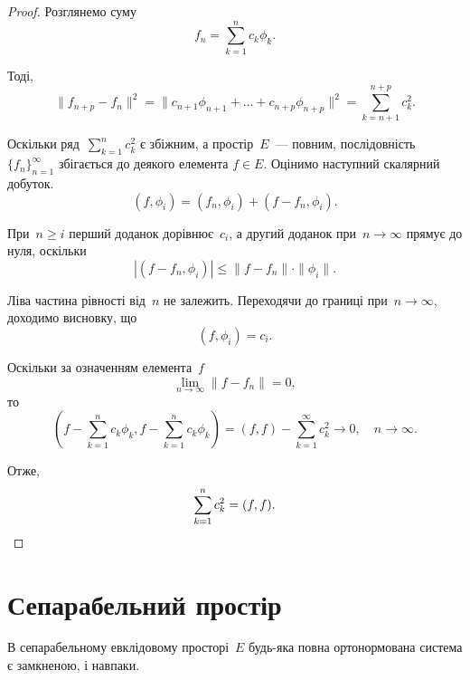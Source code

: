 \begin{proof}
Розглянемо суму
\begin{equation*}
    f_n = \sum_{k = 1}^n c_k \phi_k.
\end{equation*}

Тоді,
\begin{equation*}
    \|f_{n + p} - f_n\|^2 =
    \|c_{n + 1} \phi_{n + 1} + \dots + c_{n + p} \phi_{n + p}\|^2 =
    \sum_{k = n + 1}^{n + p} c_k^2.
\end{equation*}

Оскільки ряд~$\sum_{k = 1}^n c_k^2$ є збіжним, а простір~$E$~--- повним,
послідовність~$\{f_n\}_{n = 1}^\infty$ збігається до деякого елемента
$f \in E$. Оцінимо наступний скалярний добуток.
\begin{equation*}
    (f, \phi_i) = (f_n, \phi_i) + (f - f_n, \phi_i).
\end{equation*}

При~$n \ge i$ перший доданок дорівнює~$c_i$, а другий доданок
при~$n \to \infty$ прямує до нуля, оскільки
\begin{equation*}
    |(f - f_n, \phi_i)| \le \|f - f_n\| \cdot \|\phi_i\|.
\end{equation*}

Ліва частина рівності від~$n$ не залежить. Переходячи до
границі при~$n \to \infty$, доходимо висновку, що
\begin{equation*}
    (f, \phi_i) = c_i.
\end{equation*}

Оскільки за означенням елемента~$f$
\begin{equation*}
    \lim_{n \to \infty} \|f - f_n\| = 0,
\end{equation*}
то
\begin{equation*}
    \left( f - \sum_{k =1}^n c_k \phi_k, f - \sum_{k =1}^n c_k \phi_k \right) =
    (f, f) - \sum_{k = 1}^\infty c_k^2 \to 0, \quad n \to \infty.
\end{equation*}

Отже,
\begin{equation*}
    \sum_{k = 1}^n c_k^2 = (f, f). \qedhere
\end{equation*}
\end{proof}

\section{Сепарабельний простір}

\begin{theorem}
В сепарабельному евклідовому просторі~$E$
будь-яка повна ортонормована система є замкненою, і
навпаки.
\end{theorem}

